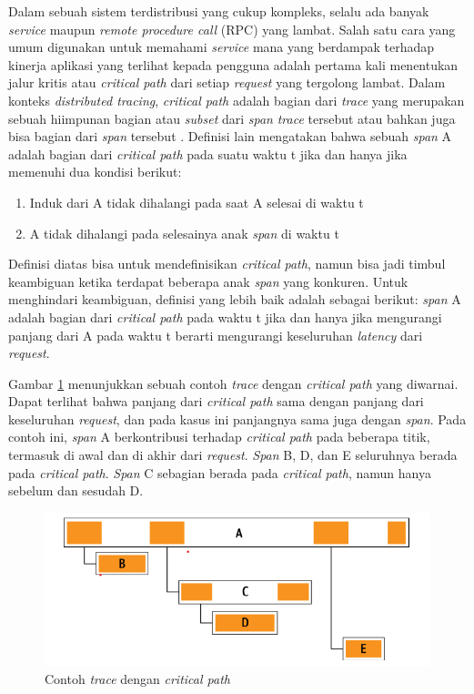 Dalam sebuah sistem terdistribusi yang cukup kompleks, selalu ada banyak \textit{service} maupun \textit{remote procedure call} (RPC) yang lambat. Salah satu cara yang umum digunakan untuk memahami \textit{service} mana yang berdampak terhadap kinerja aplikasi yang terlihat kepada pengguna adalah pertama kali menentukan jalur kritis atau \textit{critical path} dari setiap \textit{request} yang tergolong lambat. Dalam konteks \textit{distributed tracing}, \textit{critical path} adalah bagian dari \textit{trace} yang merupakan sebuah hiimpunan bagian atau \textit{subset} dari \textit{span} \textit{trace} tersebut atau bahkan juga bisa bagian dari \textit{span} tersebut \cite{parker2020distributed}. Definisi lain mengatakan bahwa sebuah \textit{span} A adalah bagian dari \textit{critical path} pada suatu waktu t jika dan hanya jika memenuhi dua kondisi berikut:
\begin{enumerate}
	\item Induk dari A tidak dihalangi pada saat A selesai di waktu t
	\item A tidak dihalangi pada selesainya anak \textit{span} di waktu t
\end{enumerate}

Definisi diatas bisa untuk mendefinisikan \textit{critical path}, namun bisa jadi timbul keambiguan ketika terdapat beberapa anak \textit{span} yang konkuren. Untuk menghindari keambiguan, definisi yang lebih baik adalah sebagai berikut: \textit{span} A adalah bagian dari \textit{critical path} pada waktu t jika dan hanya jika mengurangi panjang dari A pada waktu t berarti mengurangi keseluruhan \textit{latency} dari \textit{request}.

Gambar \ref{ch2-cp-1} menunjukkan sebuah contoh \textit{trace} dengan \textit{critical path} yang diwarnai. Dapat terlihat bahwa panjang dari \textit{critical path} sama dengan panjang dari keseluruhan \textit{request}, dan pada kasus ini panjangnya sama juga dengan \textit{span}. Pada contoh ini, \textit{span} A berkontribusi terhadap \textit{critical path} pada beberapa titik, termasuk di awal dan di akhir dari \textit{request}. \textit{Span} B, D, dan E seluruhnya berada pada \textit{critical path}. \textit{Span} C sebagian berada pada \textit{critical path}, namun hanya sebelum dan sesudah D.
\begin{figure}[htb]
	\centering
	\includegraphics[width=1\textwidth]{resources/ch2/cp-1.png}
	\caption{Contoh \textit{trace} dengan \textit{critical path} \citep{parker2020distributed}}
	\label{ch2-cp-1}
\end{figure}

